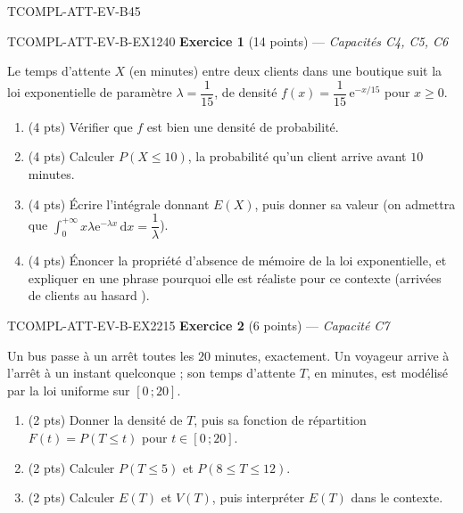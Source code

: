 \begin{evaluation}{TCOMPL-ATT-EV-B}{45}

\begin{exercice}{TCOMPL-ATT-EV-B-EX1}{2}{40}
\textbf{Exercice 1} (14 points) --- \textit{Capacités C4, C5, C6}

\medskip

Le temps d'attente $X$ (en minutes) entre deux clients dans une boutique suit la loi exponentielle de paramètre $\lambda=\dfrac{1}{15}$, de densité $f(x)=\dfrac{1}{15}\,\mathrm{e}^{-x/15}$ pour $x\geq0$.
\begin{enumerate}
  \item (4 pts) Vérifier que $f$ est bien une densité de probabilité.
  \item (4 pts) Calculer $P(X\leq10)$, la probabilité qu'un client arrive avant $10$ minutes.
  \item (4 pts) Écrire l'intégrale donnant $E(X)$, puis donner sa valeur (on admettra que $\displaystyle\int_0^{+\infty}x\lambda\mathrm{e}^{-\lambda x}\,\mathrm{d}x=\dfrac{1}{\lambda}$).
  \item (4 pts) Énoncer la propriété d'absence de mémoire de la loi exponentielle, et expliquer en une phrase pourquoi elle est réaliste pour ce contexte (arrivées de clients \og au hasard \fg{}).
\end{enumerate}
\end{exercice}

\begin{exercice}{TCOMPL-ATT-EV-B-EX2}{2}{15}
\textbf{Exercice 2} (6 points) --- \textit{Capacité C7}

\medskip

Un bus passe à un arrêt toutes les $20$ minutes, exactement. Un voyageur arrive à l'arrêt à un instant quelconque ; son temps d'attente $T$, en minutes, est modélisé par la loi uniforme sur $[0\,;20]$.
\begin{enumerate}
  \item (2 pts) Donner la densité de $T$, puis sa fonction de répartition $F(t)=P(T\leq t)$ pour $t\in[0\,;20]$.
  \item (2 pts) Calculer $P(T\leq5)$ et $P(8\leq T\leq12)$.
  \item (2 pts) Calculer $E(T)$ et $V(T)$, puis interpréter $E(T)$ dans le contexte.
\end{enumerate}
\end{exercice}

\end{evaluation}

